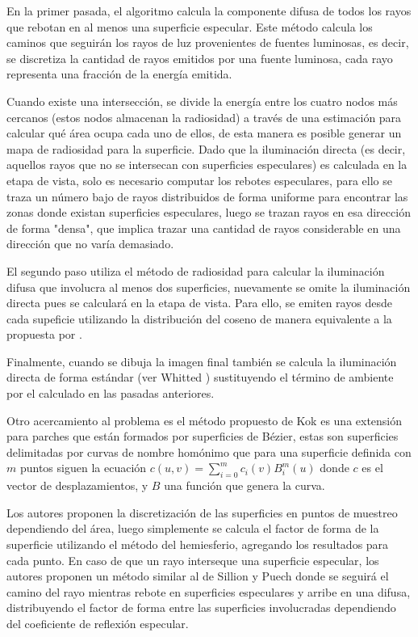 En la primer pasada, el algoritmo calcula la componente difusa de todos los rayos que rebotan en al menos una superficie especular. Este método calcula los caminos que seguirán los rayos de luz provenientes de fuentes luminosas, es decir, se discretiza la cantidad de rayos emitidos por una fuente luminosa, cada rayo representa una fracción de la energía emitida.

Cuando existe una intersección, se divide la energía entre los cuatro nodos más cercanos (estos nodos almacenan la radiosidad) a través de una estimación para calcular qué área ocupa cada uno de ellos, de esta manera es posible generar un mapa de radiosidad para la superficie. Dado que la iluminación directa (es decir, aquellos rayos que no se intersecan con superficies especulares) es calculada en la etapa de vista, solo es necesario computar los rebotes especulares, para ello se traza un número bajo de rayos distribuidos de forma uniforme para encontrar las zonas donde existan superficies especulares, luego se trazan rayos en esa dirección de forma "densa", que implica trazar una cantidad de rayos considerable en una dirección que no varía demasiado.

El segundo paso utiliza el método de radiosidad para calcular la iluminación difusa que involucra al menos dos superficies, nuevamente se omite la iluminación directa pues se calculará en la etapa de vista. Para ello, se emiten rayos desde cada supeficie utilizando la distribución del coseno de manera equivalente a la propuesta por \citeauthor{Malley}. 

Finalmente, cuando se dibuja la imagen final también se calcula la iluminación directa de forma estándar (ver Whitted \cite{Whitted}) sustituyendo el término de ambiente por el calculado en las pasadas anteriores.

Otro acercamiento al problema es el método propuesto de Kok \cite{Kok} es una extensión para parches que están formados por superficies de Bézier, estas son superficies delimitadas por curvas de nombre homónimo que para una superficie definida con $m$ puntos siguen la ecuación $c(u,v) = \sum_{i=0}^{m} c_{i}(v)B_{i}^{m}(u)$ donde $c$ es el vector de desplazamientos, y $B$ una función que genera la curva.

Los autores proponen la discretización de las superficies en puntos de muestreo dependiendo del área, luego simplemente se calcula el factor de forma de la superficie utilizando el método del hemiesferio, agregando los resultados para cada punto. En caso de que un rayo interseque una superficie especular, los autores proponen un método similar al de Sillion y Puech \cite{Sillion} donde se seguirá el camino del rayo mientras rebote en superficies especulares y arribe en una difusa, distribuyendo el factor de forma entre las superficies involucradas dependiendo del coeficiente de reflexión especular.

